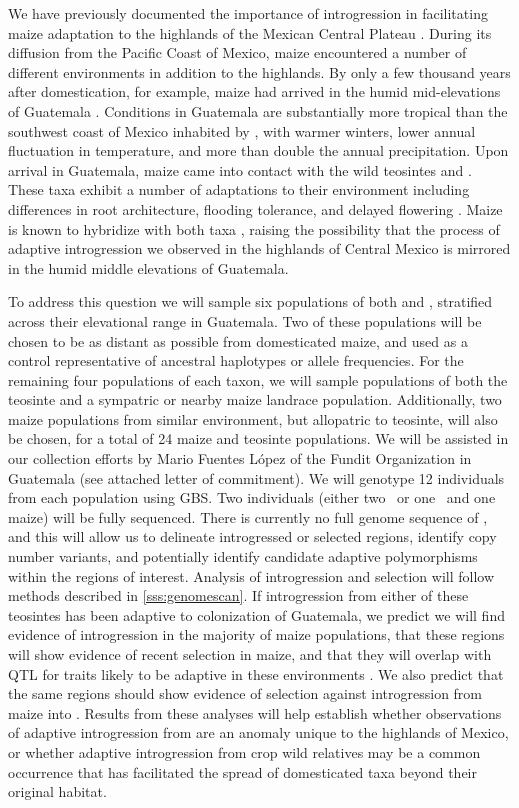 We have previously documented the importance of introgression in facilitating maize adaptation to the highlands of the Mexican Central Plateau \citep{Hufford2013}.
During its diffusion from the Pacific Coast of Mexico, maize encountered a number of different environments in addition to the highlands.
By only a few thousand years after domestication, for example, maize had arrived in the humid mid-elevations of Guatemala \citep{neff2006early}.  
Conditions in Guatemala are substantially more tropical than the southwest coast of Mexico inhabited by \zp, with warmer winters, lower annual fluctuation in temperature, and more than double the annual precipitation.
Upon arrival in Guatemala, maize came into contact with the wild teosintes \zh{} and \zl.  
These taxa exhibit a number of adaptations to their environment including differences in root architecture, flooding tolerance, and delayed flowering \citep{wilkes1967teosinte, mano2006}.
Maize is known to hybridize with both taxa \citep{wilkes1967teosinte}, raising the possibility that the process of adaptive introgression we observed in the highlands of Central Mexico is mirrored in the humid middle elevations of Guatemala.

To address this question we will sample six populations of both \zl{} and \zh{}, stratified across their elevational range in Guatemala.  
Two of these populations will be chosen to be as distant as possible from domesticated maize, and used as a control representative of ancestral haplotypes or allele frequencies.  
For the remaining four populations of each taxon, we will sample populations of both the teosinte and a sympatric or nearby maize landrace population.
Additionally, two maize populations from similar environment, but allopatric to teosinte, will also be chosen, for a total of 24 maize and teosinte populations.
We will be assisted in our collection efforts by Mario Fuentes L\'{o}pez of the Fundit Organization in Guatemala (see attached letter of commitment).
We will genotype 12 individuals from each population using GBS. 
Two individuals (either two \zl\ or one \zl\ and one maize) will be fully sequenced.
There is currently no full genome sequence of \zl, and this will allow us to delineate introgressed or selected regions, identify copy number variants, and potentially identify candidate adaptive polymorphisms within the regions of interest.
Analysis of introgression and selection will follow methods described in \ref{sss:genomescan}.
If introgression from either of these teosintes has been adaptive to colonization of Guatemala, we predict we will find evidence of introgression in the majority of maize populations, that these regions will show evidence of recent selection in maize, and that they will overlap with QTL for traits likely to be adaptive in these environments \citep[e.g.][]{omori2007qtl,mano2008linkage}.
We also predict that the same regions should show evidence of selection against introgression from maize into \zl.
Results from these analyses will help establish whether observations of adaptive introgression from \zm{} are an anomaly unique to the highlands of Mexico, or whether adaptive introgression from crop wild relatives may be a common occurrence that has facilitated the spread of domesticated taxa beyond their original habitat.


